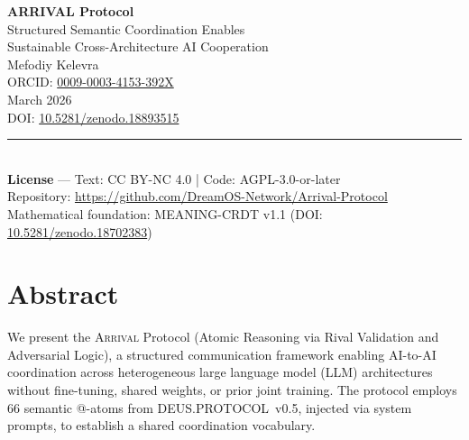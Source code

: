 \documentclass[11pt,a4paper]{article}
\newcommand{\arrival}{\textsc{Arrival}\xspace}
\begin{document}
\begin{titlepage}
\centering
\vspace*{2cm}

{\Huge\bfseries ARRIVAL Protocol}\\[0.6cm]
{\Large Structured Semantic Coordination Enables\\
Sustainable Cross-Architecture AI Cooperation}\\[2.5cm]

{\large Mefodiy Kelevra}\\[0.3cm]
{\small ORCID:
  \href{https://orcid.org/0009-0003-4153-392X}{0009-0003-4153-392X}}\\[2cm]

{\normalsize March 2026}\\[0.5cm]
{\small DOI: \href{https://doi.org/10.5281/zenodo.18893515}%
  {10.5281/zenodo.18893515}}\\[2cm]

\rule{0.6\textwidth}{0.4pt}\\[0.8cm]

{\footnotesize
  \textbf{License} — Text: CC BY-NC 4.0 \enspace|\enspace
  Code: AGPL-3.0-or-later\\[0.4cm]
  Repository:
  \url{https://github.com/DreamOS-Network/Arrival-Protocol}\\[0.2cm]
  Mathematical foundation: MEANING-CRDT v1.1
  (DOI: \href{https://doi.org/10.5281/zenodo.18702383}%
  {10.5281/zenodo.18702383})
}

\vfill
\end{titlepage}

\tableofcontents
\newpage

\section{Abstract}

We present the \arrival Protocol (Atomic Reasoning via Rival Validation
and Adversarial Logic), a structured communication framework enabling
AI-to-AI coordination across heterogeneous large language model (LLM)
architectures without fine-tuning, shared weights, or prior joint
training.  The protocol employs 66 semantic @-atoms from
DEUS.PROTOCOL~v0.5, injected via system prompts, to establish a shared
coordination vocabulary.
\end{document}
